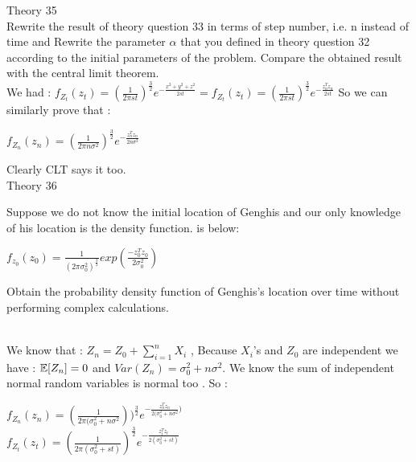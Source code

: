 \documentclass[30pt]{article}
\begin{document}
{\Large \color{blue} Theory 35 } \\
{\color{blue} Rewrite the result of theory question 33 in terms of step number, i.e. n instead of time and Rewrite the parameter $\alpha$ that you defined in theory question 32 according to the initial parameters of the problem. Compare the obtained result with the central limit theorem.
} \\ \newline 
We had : $f_{Z_t}(z_t) = (\frac{1}{2\pi st})^{\frac{3}{2}} e^{-\frac{x^2+y^2+z^2}{2st}} = f_{Z_t}(z_t) = (\frac{1}{2\pi st})^{\frac{3}{2}} e^{-\frac{z_n^Tz_n}{2st}}$ So we can similarly prove that : \\
\begin{center}
    $f_{Z_n}(z_n) = (\frac{1}{2\pi n\sigma^2})^{\frac{3}{2}} e^{-\frac{z_n^Tz_n}{2n\sigma^2}}   $
\end{center}
Clearly CLT says it too. \\

{\Large \color{blue} Theory 36 } \\
{\color{blue} Suppose we do not know the initial location of Genghis and our only knowledge of his location is the density function.
is below:\\
\begin{center}
    $f_{z_0}(z_0) = \frac{1}{(2 \pi \sigma_0^2)^\frac{3}{2}} exp(\frac{-z_0^T  z_0}{2\sigma_0^2})$
\end{center}
Obtain the probability density function of Genghis's location over time without performing complex calculations.} \\ \newline 
We know that : $Z_n = Z_0 + \sum_{i=1}^{n}X_i $ , Because $X_i$'s and $Z_0$ are independent we have : $\Bbb{E}[Z_n] = 0$ and $Var(Z_n) = \sigma_0^2 + n\sigma^2 $. We know the sum of independent normal random variables is normal too . So : \\
\begin{center}
    $f_{Z_n}(z_n) = (\frac{1}{2\pi (\sigma_0^2 + n\sigma^2}))^{\frac{3}{2}} e^{-\frac{z_n^Tz_n}{2(\sigma_0^2 + n\sigma^2})} $ \vspace{0.3cm} \\
    $ f_{Z_t}(z_t) = (\frac{1}{2\pi (\sigma_0^2 + st)})^{\frac{3}{2}} e^{-\frac{z_t^Tz_t}{2(\sigma_0^2 + st)}} $
\end{center}
\end{document}
